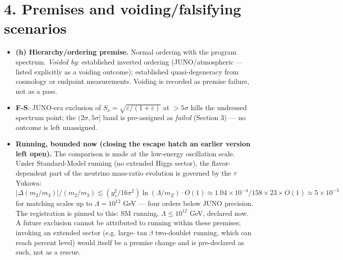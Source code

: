 \documentclass[11pt]{article}
\begin{document}
\section*{4. Premises and voiding/falsifying scenarios}
\begin{itemize}
\item \textbf{(h) Hierarchy/ordering premise.}  Normal ordering with the program spectrum.  \emph{Voided by}: established inverted ordering (JUNO/atmospheric — listed explicitly as a voiding outcome); established quasi-degeneracy from cosmology or endpoint measurements.  Voiding is recorded as premise failure, not as a pass.
\item \textbf{F-S}: JUNO-era exclusion of $S_\nu = \sqrt{\varepsilon/(1+\varepsilon)}$ at $> 5\sigma$ kills the undressed spectrum point; the $(2\sigma, 5\sigma]$ band is pre-assigned as \emph{failed} (Section 3) — no outcome is left unassigned.
\item \textbf{Running, bounded now (closing the escape hatch an earlier version left open).}  The comparison is made at the low-energy oscillation scale.  Under Standard-Model running (no extended Higgs sector), the flavor-dependent part of the neutrino mass-ratio evolution is governed by the $\tau$ Yukawa: $|\Delta(m_2/m_3)|/(m_2/m_3) \lesssim (y_\tau^2/16\pi^2)\ln(\Lambda/m_Z)\cdot O(1) \approx 1.04\times 10^{-4}/158 \times 23 \times O(1) \approx 5\times 10^{-5}$ for matching scales up to $\Lambda = 10^{12}$ GeV — four orders below JUNO precision.  The registration is pinned to this: SM running, $\Lambda \le 10^{12}$ GeV, declared now.  A future exclusion cannot be attributed to running within these premises; invoking an extended sector (e.g. large-$\tan\beta$ two-doublet running, which can reach percent level) would itself be a premise change and is pre-declared as such, not as a rescue.
\end{itemize}
\end{document}
